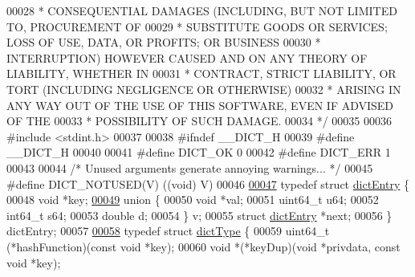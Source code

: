 \begin{DoxyCode}
00028 \textcolor{comment}{ * CONSEQUENTIAL DAMAGES (INCLUDING, BUT NOT LIMITED TO, PROCUREMENT OF}
00029 \textcolor{comment}{ * SUBSTITUTE GOODS OR SERVICES; LOSS OF USE, DATA, OR PROFITS; OR BUSINESS}
00030 \textcolor{comment}{ * INTERRUPTION) HOWEVER CAUSED AND ON ANY THEORY OF LIABILITY, WHETHER IN}
00031 \textcolor{comment}{ * CONTRACT, STRICT LIABILITY, OR TORT (INCLUDING NEGLIGENCE OR OTHERWISE)}
00032 \textcolor{comment}{ * ARISING IN ANY WAY OUT OF THE USE OF THIS SOFTWARE, EVEN IF ADVISED OF THE}
00033 \textcolor{comment}{ * POSSIBILITY OF SUCH DAMAGE.}
00034 \textcolor{comment}{ */}
00035 
00036 \textcolor{preprocessor}{#}\textcolor{preprocessor}{include} \textcolor{preprocessor}{<}\textcolor{preprocessor}{stdint}\textcolor{preprocessor}{.}\textcolor{preprocessor}{h}\textcolor{preprocessor}{>}
00037 
00038 \textcolor{preprocessor}{#}\textcolor{preprocessor}{ifndef} \textcolor{preprocessor}{\_\_DICT\_H}
00039 \textcolor{preprocessor}{#}\textcolor{preprocessor}{define} \textcolor{preprocessor}{\_\_DICT\_H}
00040 
00041 \textcolor{preprocessor}{#}\textcolor{preprocessor}{define} \textcolor{preprocessor}{DICT\_OK} 0
00042 \textcolor{preprocessor}{#}\textcolor{preprocessor}{define} \textcolor{preprocessor}{DICT\_ERR} 1
00043 
00044 \textcolor{comment}{/* Unused arguments generate annoying warnings... */}
00045 \textcolor{preprocessor}{#}\textcolor{preprocessor}{define} \textcolor{preprocessor}{DICT\_NOTUSED}\textcolor{preprocessor}{(}\textcolor{preprocessor}{V}\textcolor{preprocessor}{)} \textcolor{preprocessor}{(}\textcolor{preprocessor}{(}\textcolor{keywordtype}{void}\textcolor{preprocessor}{)} \textcolor{preprocessor}{V}\textcolor{preprocessor}{)}
00046 
\hyperlink{structdictEntry}{00047} \textcolor{keyword}{typedef} \textcolor{keyword}{struct} \hyperlink{structdictEntry}{dictEntry} \{
00048     \textcolor{keywordtype}{void} *key;
\hyperlink{uniondictEntry_8v}{00049}     \textcolor{keyword}{union} \{
00050         \textcolor{keywordtype}{void} *val;
00051         uint64\_t u64;
00052         int64\_t s64;
00053         \textcolor{keywordtype}{double} d;
00054     \} v;
00055     \textcolor{keyword}{struct} \hyperlink{structdictEntry}{dictEntry} *next;
00056 \} dictEntry;
00057 
\hyperlink{structdictType}{00058} \textcolor{keyword}{typedef} \textcolor{keyword}{struct} \hyperlink{structdictType}{dictType} \{
00059     uint64\_t (*hashFunction)(\textcolor{keyword}{const} \textcolor{keywordtype}{void} *key);
00060     \textcolor{keywordtype}{void} *(*keyDup)(\textcolor{keywordtype}{void} *privdata, \textcolor{keyword}{const} \textcolor{keywordtype}{void} *key);

\end{DoxyCode}
